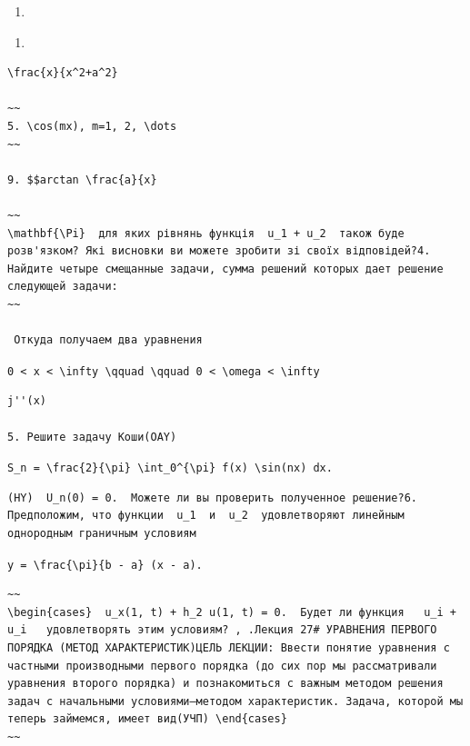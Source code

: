 \documentclass[
  ukrainian,
]{article}
\providecommand{\tightlist}{%
  \setlength{\itemsep}{0pt}\setlength{\parskip}{0pt}}
\begin{document}
\begin{enumerate}
\def\labelenumi{\alph{enumi})}
\tightlist
\item
\end{enumerate}

\begin{enumerate}
\def\labelenumi{\arabic{enumi}.}
\setcounter{enumi}{6}
\tightlist
\item
\end{enumerate}

\begin{verbatim}
\frac{x}{x^2+a^2}

~~
5. \cos(mx), m=1, 2, \dots
~~

9. $$arctan \frac{a}{x}

~~
\mathbf{\Pi}  для яких рівнянь функція  u_1 + u_2  також буде розв'язком? Які висновки ви можете зробити зі своїх відповідей?4. Найдите четыре смещанные задачи, сумма решений которых дает решение следующей задачи:
~~

 Откуда получаем два уравнения
\end{verbatim}

\texttt{0\ \textless{}\ x\ \textless{}\ \textbackslash{}infty\ \textbackslash{}qquad\ \textbackslash{}qquad\ 0\ \textless{}\ \textbackslash{}omega\ \textless{}\ \textbackslash{}infty}

\begin{verbatim}
j''(x)

5. Решите задачу Коши(OAY)
\end{verbatim}

\texttt{S\_n\ =\ \textbackslash{}frac\{2\}\{\textbackslash{}pi\}\ \textbackslash{}int\_0\^{}\{\textbackslash{}pi\}\ f(x)\ \textbackslash{}sin(nx)\ dx.}

\begin{verbatim}
(HY)  U_n(0) = 0.  Можете ли вы проверить полученное решение?6. Предположим, что функции  u_1  и  u_2  удовлетворяют линейным однородным граничным условиям
\end{verbatim}

\texttt{y\ =\ \textbackslash{}frac\{\textbackslash{}pi\}\{b\ -\ a\}\ (x\ -\ a).}

\begin{verbatim}
~~
\begin{cases}  u_x(1, t) + h_2 u(1, t) = 0.  Будет ли функция   u_i + u_i   удовлетворять этим условиям? , .Лекция 27# УРАВНЕНИЯ ПЕРВОГО ПОРЯДКА (МЕТОД ХАРАКТЕРИСТИК)ЦЕЛЬ ЛЕКЦИИ: Ввести понятие уравнения с частными производными первого порядка (до сих пор мы рассматривали уравнения второго порядка) и познакомиться с важным методом решения задач с начальными условиями—методом характеристик. Задача, которой мы теперь займемся, имеет вид(УЧП) \end{cases}
~~
\end{verbatim}
\end{document}
